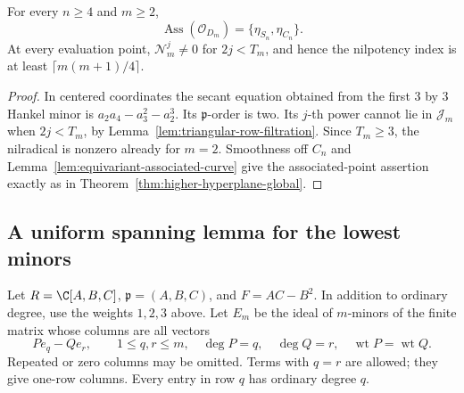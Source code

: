\begin{corollary}
\label{cor:all-degree-embedded-support}
For every $n\ge4$ and $m\ge2$,
\[
 \operatorname{Ass}(\mathcal O_{D_m})
       =\{\eta_{S_n},\eta_{C_n}\}.
\]
At every evaluation point,
$\mathcal N_m^j\ne0$ for $2j<T_m$, and hence the nilpotency index
is at least $\lceil m(m+1)/4\rceil$.
\end{corollary}
\begin{proof}
In centered coordinates the secant equation obtained from the first
$3$ by $3$ Hankel minor is
$a_2a_4-a_3^2-a_2^3$. Its $\mathfrak p$-order is two. Its $j$-th
power cannot lie in $\mathcal J_m$ when $2j<T_m$, by
Lemma~\ref{lem:triangular-row-filtration}. Since $T_m\ge3$, the
nilradical is nonzero already for $m=2$. Smoothness off $C_n$ and
Lemma~\ref{lem:equivariant-associated-curve} give the associated-point
assertion exactly as in Theorem~\ref{thm:higher-hyperplane-global}.
\end{proof}

\subsection{A uniform spanning lemma for the lowest minors}
Let $R=\C[A,B,C]$, $\mathfrak p=(A,B,C)$, and $F=AC-B^2$.
In addition to ordinary degree, use the weights $1,2,3$ above.
Let $E_m$ be the ideal of $m$-minors of the finite matrix whose
columns are all vectors
\begin{equation}\label{eq:weighted-relation-columns}
 P e_q-Q e_r,\qquad
 1\le q,r\le m,\quad
 \deg P=q,\quad \deg Q=r,\quad
 \operatorname{wt}P=\operatorname{wt}Q.
\end{equation}
Repeated or zero columns may be omitted. Terms with $q=r$ are
allowed; they give one-row columns. Every entry in row $q$ has
ordinary degree $q$.

